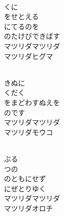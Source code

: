 \documentclass[10pt,b5j]{tarticle} %
\begin{document}
\vspace{1.5em} %
\newcommand{\linespace}{0.5em} %
\newcommand{\blocksize}{0.5\hsize} %
\newcommand{\itemmargin}{6em} %
\begin{enumerate} %
    \setlength{\itemindent}{\itemmargin} %
    \begin{minipage}[c]{\blocksize}
    
        \vspace{\linespace}
        \item~\\
        くに\\
        をせとえる\\
        にてるのを\\
        のたけびできばす\\
        マツリダマツリダ\\
        マツリダヒグマ
        
        \vspace{\linespace}
        \item~\\
        きぬに\\
        くだく\\
        をまどわすぬえを\\
        のです\\
        マツリダマツリダ\\
        マツリダモウコ
        
        \vspace{\linespace}
        \item~\\
        ぶる\\
        つの\\
        のともにせず\\
        にぜとりゆく\\
        マツリダマツリダ\\
        マツリダオロチ
        

\end{minipage}
\end{enumerate}
\end{document}
